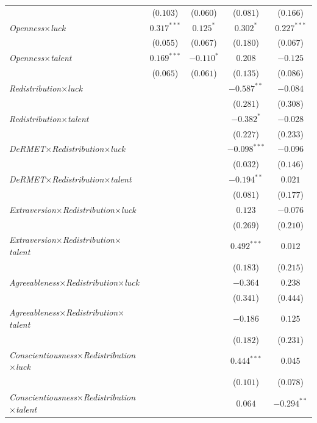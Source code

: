 \begin{footnotesize}
\begin{longtable}{l cc cc}
    & ($0.103$) & ($0.060$) & ($0.081$) & ($0.166$) \\
\textit{Openness}$\times$\textit{luck} & $0.317^{***}$ & $0.125^{*}$ & $0.302^{*}$ & $0.227^{***}$ \\
    & ($0.055$) & ($0.067$) & ($0.180$) & ($0.067$) \\
\textit{Openness}$\times$\textit{talent} & $0.169^{***}$ & $-0.110^{*}$ & $0.208$ & $-0.125$ \\
    & ($0.065$) & ($0.061$) & ($0.135$) & ($0.086$) \\
\textit{Redistribution}$\times$\textit{luck} &  &  & $-0.587^{**}$ & $-0.084$ \\
    &  &  & ($0.281$) & ($0.308$) \\
\textit{Redistribution}$\times$\textit{talent} &  &  & $-0.382^{*}$ & $-0.028$ \\
    &  &  & ($0.227$) & ($0.233$) \\
\textit{DeRMET}$\times$\textit{Redistribution}$\times$\textit{luck} &  &  & $-0.098^{***}$ & $-0.096$ \\
    &  &  & ($0.032$) & ($0.146$) \\
\textit{DeRMET}$\times$\textit{Redistribution}$\times$\textit{talent} &  &  & $-0.194^{**}$ & $0.021$ \\
    &  &  & ($0.081$) & ($0.177$) \\
\textit{Extraversion}$\times$\textit{Redistribution}$\times$\textit{luck} &  &  & $0.123$ & $-0.076$ \\
    &  &  & ($0.269$) & ($0.210$) \\
\textit{Extraversion}$\times$\textit{Redistribution}$\times$\textit{talent} &  &  & $0.492^{***}$ & $0.012$ \\
    &  &  & ($0.183$) & ($0.215$) \\
\textit{Agreeableness}$\times$\textit{Redistribution}$\times$\textit{luck} &  &  & $-0.364$ & $0.238$ \\
    &  &  & ($0.341$) & ($0.444$) \\
\textit{Agreeableness}$\times$\textit{Redistribution}$\times$\textit{talent} &  &  & $-0.186$ & $0.125$ \\
    &  &  & ($0.182$) & ($0.231$) \\
\textit{Conscientiousness}$\times$\textit{Redistribution}$\times$\textit{luck} &  &  & $0.444^{***}$ & $0.045$ \\
    &  &  & ($0.101$) & ($0.078$) \\
\textit{Conscientiousness}$\times$\textit{Redistribution}$\times$\textit{talent} &  &  & $0.064$ & $-0.294^{**}$ \\

\end{longtable}
\end{footnotesize}
